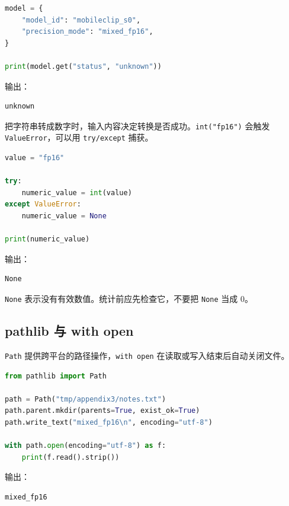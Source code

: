 \begin{lstlisting}[language=Python]
model = {
    "model_id": "mobileclip_s0",
    "precision_mode": "mixed_fp16",
}

print(model.get("status", "unknown"))
\end{lstlisting}

输出：

\begin{lstlisting}
unknown
\end{lstlisting}

把字符串转成数字时，输入内容决定转换是否成功。\passthrough{\lstinline!int("fp16")!}
会触发 \passthrough{\lstinline!ValueError!}，可以用
\passthrough{\lstinline!try/except!} 捕获。

\begin{lstlisting}[language=Python]
value = "fp16"

try:
    numeric_value = int(value)
except ValueError:
    numeric_value = None

print(numeric_value)
\end{lstlisting}

输出：

\begin{lstlisting}
None
\end{lstlisting}

\passthrough{\lstinline!None!}
表示没有有效数值。统计前应先检查它，不要把
\passthrough{\lstinline!None!} 当成 0。

\subsection{pathlib 与 with open}\label{pathlib-ux4e0e-with-open}

\passthrough{\lstinline!Path!}
提供跨平台的路径操作，\passthrough{\lstinline!with open!}
在读取或写入结束后自动关闭文件。

\begin{lstlisting}[language=Python]
from pathlib import Path

path = Path("tmp/appendix3/notes.txt")
path.parent.mkdir(parents=True, exist_ok=True)
path.write_text("mixed_fp16\n", encoding="utf-8")

with path.open(encoding="utf-8") as f:
    print(f.read().strip())
\end{lstlisting}

输出：

\begin{lstlisting}
mixed_fp16
\end{lstlisting}

